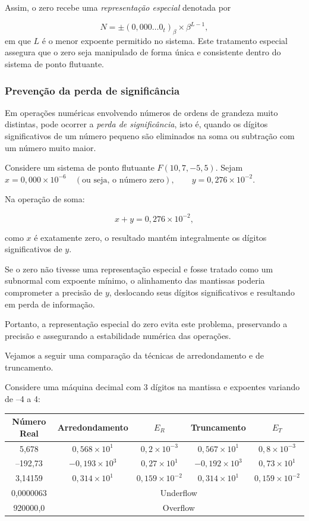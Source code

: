 Assim, o zero recebe uma \textit{representação especial} denotada por

\[
N = \pm (0{,}000\ldots 0_{t})_\beta \times \beta^{L - 1},
\]
em que \( L \) é o menor expoente permitido no sistema. Este tratamento especial assegura que o zero seja manipulado de forma única e consistente dentro do sistema de ponto flutuante.

\subsubsection*{Prevenção da perda de significância}

Em operações numéricas envolvendo números de ordens de grandeza muito distintas, pode ocorrer a \textit{perda de significância}, isto é, quando os dígitos significativos de um número pequeno são eliminados na soma ou subtração com um número muito maior.

Considere um sistema de ponto flutuante $F(10, 7, -5, 5)$. Sejam \(
x = 0{,}000 \times 10^{-6} \quad (\text{ou seja, o número zero}), \qquad y = 0{,}276 \times 10^{-2}.
\)

Na operação de soma:

\[
x + y = 0{,}276 \times 10^{-2},
\]

como \( x \) é exatamente zero, o resultado mantém integralmente os dígitos significativos de \( y \).

Se o zero não tivesse uma representação especial e fosse tratado como um subnormal com expoente mínimo, o alinhamento das mantissas poderia comprometer a precisão de \( y \), deslocando seus dígitos significativos e resultando em perda de informação. 

Portanto, a representação especial do zero evita este problema, preservando a precisão e assegurando a estabilidade numérica das operações.

Vejamos a seguir uma comparação da técnicas de arredondamento e de truncamento.

Considere uma máquina decimal com 3 dígitos na mantissa e expoentes variando de –4 a 4:

\begin{center}
\small
\begin{tabular}{|c|c|c|c|c|}
\hline
\textbf{Número Real} & \textbf{Arredondamento} & \textbf{\(E_R\)}  & \textbf{Truncamento} & \textbf{\(E_T\)}  \\
\hline
5{,}678 & \( 0{,}568 \times 10^1 \) & \( 0{,}2 \times 10^{-3} \) & \( 0{,}567 \times 10^1 \) & \( 0{,}8 \times 10^{-3} \) \\
\hline
–192{,}73 & \( -0{,}193 \times 10^3 \) & \( 0{,}27 \times 10^{1} \) & \( -0{,}192 \times 10^3 \) & \( 0{,}73 \times 10^{1} \) \\
\hline
3{,}14159 & \( 0{,}314 \times 10^1 \) & \( 0{,}159 \times 10^{-2} \) & \( 0{,}314 \times 10^1 \) & \( 0{,}159 \times 10^{-2} \) \\
\hline
0{,}0000063 & \multicolumn{4}{c|}{Underflow} \\
\hline
920000{,}0 & \multicolumn{4}{c|}{Overflow} \\
\hline
\end{tabular}
\end{center}

